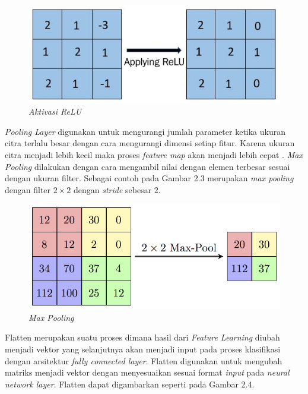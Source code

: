 \begin{figure} [ht] \centering
    \includegraphics[scale=1]{gambar/aktivasiReLU.png}
    \caption{\emph{Aktivasi ReLU}}
    \label{fig:Aktivasi ReLU}
\end{figure}

\emph{Pooling Layer} digunakan untuk mengurangi jumlah parameter ketika ukuran citra terlalu besar dengan cara mengurangi dimensi setiap fitur. Karena ukuran citra menjadi lebih kecil maka proses \emph{feature map} akan menjadi lebih cepat \parencite{hakim2018penerapan}. \emph{Max Pooling} dilakukan dengan cara mengambil nilai dengan elemen terbesar sesuai dengan ukuran filter. Sebagai contoh pada Gambar 2.3 merupakan \emph{max pooling} dengan filter \(2 \times 2\) dengan \emph{stride} sebesar 2.

\begin{figure} [ht] \centering
    \includegraphics[scale=1.5]{gambar/maxPooling.png}
    \caption{\emph{Max Pooling}}
    \label{fig:Max Pooling}
\end{figure}

Flatten merupakan suatu proses dimana hasil dari \emph{Feature Learning} diubah menjadi vektor yang selanjutnya akan menjadi input pada proses klasifikasi dengan arsitektur \emph{fully connected layer}. Flatten digunakan untuk mengubah matriks menjadi vektor dengan menyesuaikan sesuai format \emph{input} pada \emph{neural network layer}. Flatten dapat digambarkan seperti pada Gambar 2.4.

